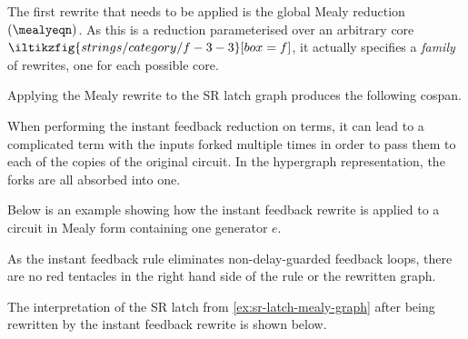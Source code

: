 The first rewrite that needs to be applied is the global Mealy reduction
\((\mealyeqn)\).
As this is a reduction parameterised over an arbitrary core \(
\iltikzfig{strings/category/f-3-3}[box=f]
\), it actually specifies a \emph{family} of rewrites, one for each possible
core.

\begin{example}\label{ex:sr-latch-mealy-graph}
    Applying the Mealy rewrite to the SR latch graph produces the following
    cospan.
    \begin{center}
    \end{center}
\end{example}

When performing the instant feedback reduction on terms, it can lead to a
complicated term with the inputs forked multiple times in order to pass them to
each of the copies of the original circuit.
In the hypergraph representation, the forks are all absorbed into one.

\begin{example}\label{ex:instant-feedback-rewrite}
    Below is an example showing how the instant feedback rewrite is applied to
    a circuit in Mealy form containing one generator \(e\).
    \begin{center}
        
    \end{center}
\end{example}

As the instant feedback rule eliminates non-delay-guarded feedback loops, there
are no red tentacles in the right hand side of the rule or the rewritten graph.

\begin{example}\label{ex:sr-latch-instant-feedback-graph}
    The interpretation of the SR latch from \cref{ex:sr-latch-mealy-graph}
    after being rewritten by the instant feedback rewrite is shown below.
    \begin{center}
    \end{center}
\end{example}




